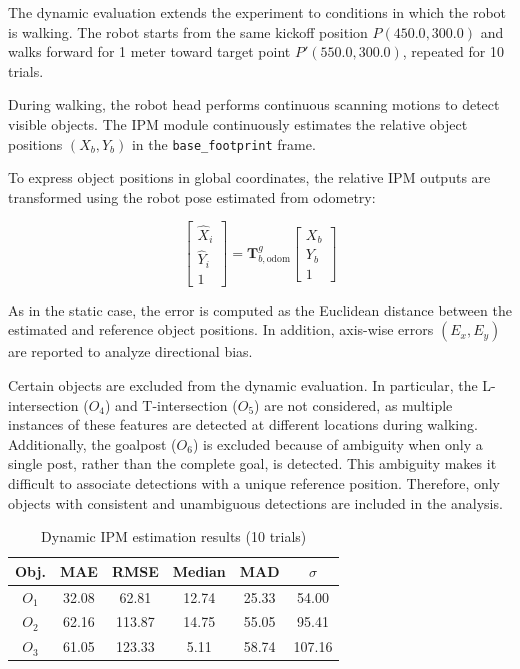 \documentclass[journal]{IAENGtran}
\begin{document}
The dynamic evaluation extends the experiment to conditions in
which the robot is walking. The robot starts from the same kickoff
position $P(450.0, 300.0)$ and walks forward for 1 meter toward target point
$P'(550.0, 300.0)$, repeated for 10 trials.

During walking, the robot head performs continuous scanning motions
to detect visible objects. The IPM module continuously estimates
the relative object positions $(X_b, Y_b)$ in the
\texttt{base\_footprint} frame.

To express object positions in global coordinates, the relative
IPM outputs are transformed using the robot pose estimated from odometry:

\begin{equation}
\begin{bmatrix}
\hat{X}_i \\
\hat{Y}_i \\
1
\end{bmatrix}
=
\mathbf{T}_{b,\text{odom}}^{g}
\begin{bmatrix}
X_b \\
Y_b \\
1
\end{bmatrix}
\end{equation}

As in the static case, the error is computed as the Euclidean
distance between the estimated and reference object positions.
In addition, axis-wise errors $(E_x, E_y)$ are reported to analyze
directional bias.

Certain objects are excluded from the dynamic evaluation. In particular,
the L-intersection ($O_4$) and T-intersection ($O_5$) are not considered,
as multiple instances of these features are detected at different
locations during walking. Additionally, the goalpost ($O_6$) is excluded because of
ambiguity when only a single post, rather than the complete goal, is detected.
This ambiguity makes it difficult to associate detections with a unique reference position.
Therefore, only objects with consistent and unambiguous detections are included in the analysis.

\begin{table}[h]
\centering
\footnotesize
\caption{Dynamic IPM estimation results (10 trials)}
\label{tab:dynamic_results}
\begin{tabular}{c c c c c c}
\toprule
\textbf{Obj.} &
\textbf{MAE} &
\textbf{RMSE} &
\textbf{Median} &
\textbf{MAD} &
\textbf{$\sigma$} \\
\midrule
$O_1$ & 32.08 & 62.81  & 12.74 & 25.33 & 54.00  \\
$O_2$ & 62.16 & 113.87 & 14.75 & 55.05 & 95.41  \\
$O_3$ & 61.05 & 123.33 & 5.11  & 58.74 & 107.16 \\
\bottomrule
\end{tabular}
\end{table}
\end{document}
